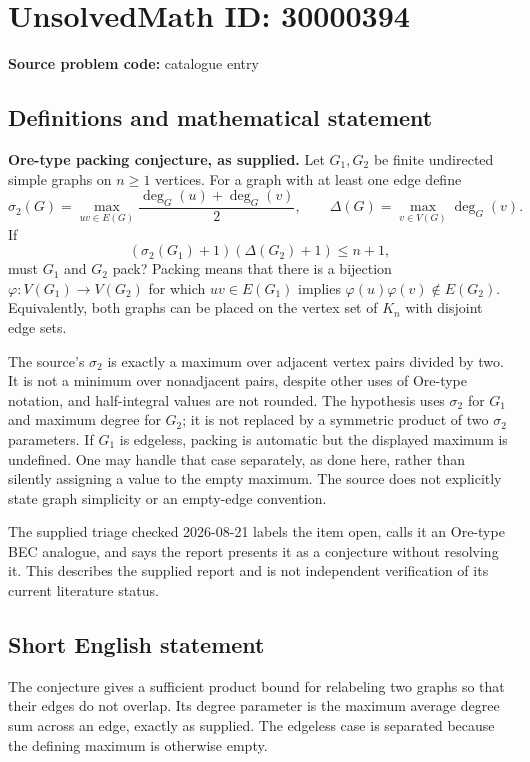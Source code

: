 \documentclass[11pt]{article}
\begin{document}
\section*{UnsolvedMath ID: 30000394}
\textbf{Source problem code:} catalogue entry
\subsection{Definitions and mathematical statement}
\textbf{Ore-type packing conjecture, as supplied.} Let \(G_1,G_2\) be finite undirected simple graphs on \(n\ge1\) vertices. For a graph with at least one edge define\[\sigma_2(G)=\max_{uv\in E(G)}\frac{\deg_G(u)+\deg_G(v)}2,\qquad \Delta(G)=\max_{v\in V(G)}\deg_G(v).\] If\[(\sigma_2(G_1)+1)(\Delta(G_2)+1)\le n+1,\] must \(G_1\) and \(G_2\) pack? Packing means that there is a bijection \(\varphi:V(G_1)\to V(G_2)\) for which \(uv\in E(G_1)\) implies \(\varphi(u)\varphi(v)\notin E(G_2)\). Equivalently, both graphs can be placed on the vertex set of \(K_n\) with disjoint edge sets.\par The source's \(\sigma_2\) is exactly a maximum over adjacent vertex pairs divided by two. It is not a minimum over nonadjacent pairs, despite other uses of Ore-type notation, and half-integral values are not rounded. The hypothesis uses \(\sigma_2\) for \(G_1\) and maximum degree for \(G_2\); it is not replaced by a symmetric product of two \(\sigma_2\) parameters. If \(G_1\) is edgeless, packing is automatic but the displayed maximum is undefined. One may handle that case separately, as done here, rather than silently assigning a value to the empty maximum. The source does not explicitly state graph simplicity or an empty-edge convention.\par The supplied triage checked 2026-08-21 labels the item open, calls it an Ore-type BEC analogue, and says the report presents it as a conjecture without resolving it. This describes the supplied report and is not independent verification of its current literature status.
\subsection{Short English statement}
The conjecture gives a sufficient product bound for relabeling two graphs so that their edges do not overlap. Its degree parameter is the maximum average degree sum across an edge, exactly as supplied. The edgeless case is separated because the defining maximum is otherwise empty.
\end{document}
